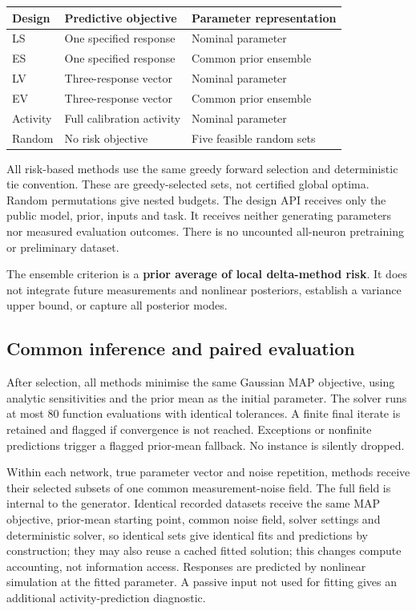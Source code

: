 \begin{center}

\centering\small
\begin{tabular*}{\textwidth}{@{\extracolsep{\fill}}lll}
\toprule
Design & Predictive objective & Parameter representation \\
\midrule
LS & One specified response & Nominal parameter \\
ES & One specified response & Common prior ensemble \\
LV & Three-response vector & Nominal parameter \\
EV & Three-response vector & Common prior ensemble \\
Activity & Full calibration activity & Nominal parameter \\
Random & No risk objective & Five feasible random sets \\
\bottomrule
\end{tabular*}
\end{center}

All risk-based methods use the same greedy forward selection and deterministic tie convention. These are greedy-selected sets, not certified global optima. Random permutations give nested budgets. The design API receives only the public model, prior, inputs and task. It receives neither generating parameters nor measured evaluation outcomes. There is no uncounted all-neuron pretraining or preliminary dataset.

The ensemble criterion is a \textbf{prior average of local delta-method risk}. It does not integrate future measurements and nonlinear posteriors, establish a variance upper bound, or capture all posterior modes.

\subsection{Common inference and paired evaluation}

After selection, all methods minimise the same Gaussian MAP objective, using analytic sensitivities and the prior mean as the initial parameter. The solver runs at most 80 function evaluations with identical tolerances. A finite final iterate is retained and flagged if convergence is not reached. Exceptions or nonfinite predictions trigger a flagged prior-mean fallback. No instance is silently dropped.

Within each network, true parameter vector and noise repetition, methods receive their selected subsets of one common measurement-noise field. The full field is internal to the generator. Identical recorded datasets receive the same MAP objective, prior-mean starting point, common noise field, solver settings and deterministic solver, so identical sets give identical fits and predictions by construction; they may also reuse a cached fitted solution; this changes compute accounting, not information access. Responses are predicted by nonlinear simulation at the fitted parameter. A passive input not used for fitting gives an additional activity-prediction diagnostic.

